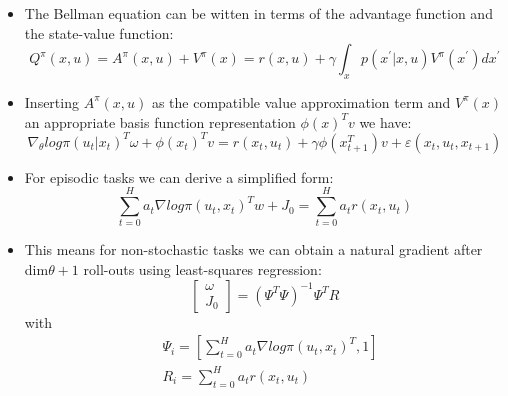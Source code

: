 {\begin{pcolumn}
\vspace*{-28mm}
%
{\large
\begin{itemize}
	\item The Bellman equation can be witten in terms of 	the advantage function and the state-value function:
\begin{equation}
	Q^\pi (x, u) = A^\pi(x, u) + V^\pi(x) = r(x,u) + \gamma \int_x p(x^{'}|x,u)V^\pi(x^{'})dx^{'}
\end{equation}
	\item Inserting $A^\pi(x,u)$ as the compatible value approximation term and $V^\pi(x)$ an appropriate basis function representation $\phi(x)^Tv$ we have:
\begin{equation}
	\nabla_\theta log \pi(u_t|x_t)^T\omega + \phi(x_t)^Tv = r(x_t, u_t) + \gamma\phi(x_{t+1}^T)v + \varepsilon(x_t, u_t, x_{t+1})
\end{equation}
	\item  For episodic tasks we can derive a simplified form:
\begin{equation}
	\sum_{t=0}^H a_t \nabla log \pi(u_t, x_t)^Tw + J_0 = \sum_{t=0}^H a_t r(x_t, u_t)
\end{equation}
	\item This means for non-stochastic tasks we can obtain a natural gradient after dim$\theta + 1$ roll-outs using least-squares regression:
\begin{equation}
	\left[
	\begin{matrix}
		\omega \\
		J_0
	\end{matrix}
	\right] = (\Psi^T \Psi)^{-1}\Psi^T R
\end{equation}
with
\begin{eqnarray}
	& \Psi_i = \left[\sum_{t=0}^{H}a_t \nabla log \pi (u_t, x_t)^T, 1 \right] \\
	& R_i = \sum_{t=0}^{H}a_t r(x_t, u_t)
\end{eqnarray}


\end{itemize}}
\end{pcolumn}}
